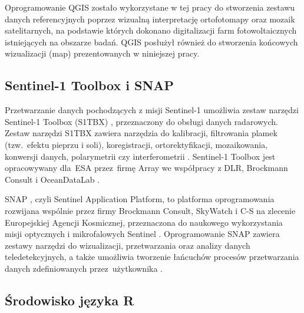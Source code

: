 \documentclass{amuthesis}
\begin{document}
Oprogramowanie QGIS zostało wykorzystane w tej pracy do stworzenia
zestawu danych referencyjnych poprzez wizualną interpretację
ortofotomapy oraz mozaik satelitarnych, na podstawie których dokonano
digitalizacji farm fotowoltaicznych istniejących na obszarze badań. QGIS
posłużył również do stworzenia końcowych wizualizacji (map)
prezentowanych w niniejszej pracy.

\hypertarget{sentinel-1-toolbox-i-snap}{%
\subsection{Sentinel-1 Toolbox i SNAP}\label{sentinel-1-toolbox-i-snap}}

Przetwarzanie danych pochodzących z misji Sentinel-1 umożliwia zestaw
narzędzi Sentinel-1 Toolbox (S1TBX) \autocite{s1tbx}, przeznaczony do
obsługi danych radarowych. Zestaw narzędzi S1TBX zawiera narzędzia do
kalibracji, filtrowania plamek (tzw.~efektu pieprzu i soli),
koregistracji, ortorektyfikacji, mozaikowania, konwersji danych,
polarymetrii czy interferometrii \autocite{sentinel-1-toolbox}.
Sentinel-1 Toolbox jest opracowywany dla~ESA przez~firmę Array we
współpracy z DLR, Brockmann Consult i OceanDataLab
\autocite{sentinel-1-toolbox}.

SNAP \autocite{snap}, czyli Sentinel Application Platform, to platforma
oprogramowania rozwijana wspólnie przez firmy Brockmann Consult,
SkyWatch i C-S na zlecenie Europejskiej Agencji Kosmicznej, przeznaczona
do naukowego wykorzystania misji optycznych i mikrofalowych Sentinel
\autocite{snap-desktop,esa_snap}. Oprogramowanie SNAP zawiera zestawy
narzędzi do wizualizacji, przetwarzania oraz analizy danych
teledetekcyjnych, a także umożliwia tworzenie łańcuchów procesów
przetwarzania danych zdefiniowanych przez~użytkownika
\autocite{hejmanowska_2020_dane,moskolai_2022_s1_workflow}.

\hypertarget{ux15brodowisko-jux119zyka-r}{%
\subsection{Środowisko języka R}\label{ux15brodowisko-jux119zyka-r}}
\end{document}
